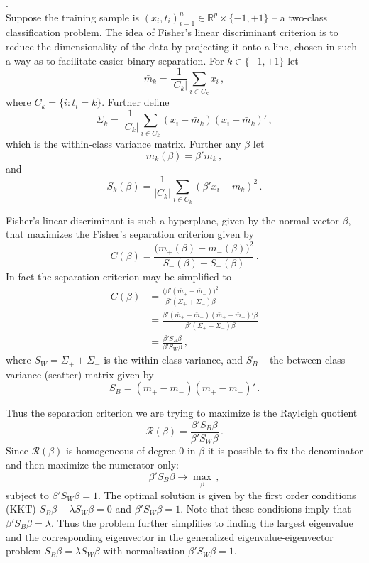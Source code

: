 \documentclass[a4paper]{article}
\newcommand{\Real}{\mathbb{R}}
\begin{document}
 .\hfill\\
Suppose the training sample is $(x_i, t_i)_{i=1}^n \in \Real^p \times\{-1,+1\}$ --
a two-class classification problem. The idea of Fisher's linear discriminant
criterion is to reduce the dimensionality of the data by projecting it onto a line,
chosen in such a way as to facilitate easier binary separation. For $k\in\{-1,+1\}$
let
\[ \bar{m}_k = \frac{1}{|C_k|} \sum_{i\in C_k} x_i \,, \]
where $C_k = \{ i : t_i = k \}$. Further define
\[
\Sigma_k = \frac{1}{|C_k|} \sum_{i\in C_k} ( x_i - \bar{m}_k )( x_i - \bar{m}_k )'\,,
\]
which is the within-class variance matrix. Further any $\beta$ let
\[ m_k(\beta) = \beta'\bar{m}_k\,, \] 
and
\[ S_k(\beta) = \frac{1}{|C_k|} \sum_{i\in C_k} ( \beta'x_i - m_k )^2 \,. \]

Fisher's linear discriminant is such a hyperplane, given by the normal vector $\beta$,
that maximizes the Fisher's separation criterion given by
\[ C(\beta) = \frac{\bigl(m_+(\beta)-m_-(\beta)\bigr)^2}{ S_-(\beta) + S_+(\beta) }\,. \]
In fact the separation criterion may be simplified to
\begin{align*}
	C(\beta)
	&= \frac{\bigl(\beta'(\bar{m}_+ - \bar{m}_-)\bigr)^2}{ \beta'( \Sigma_+ + \Sigma_- )\beta }\\
	&= \frac{\beta'(\bar{m}_+ - \bar{m}_-)(\bar{m}_+ - \bar{m}_-)'\beta}{ \beta'( \Sigma_+ + \Sigma_- )\beta }\\
	&= \frac{\beta'S_B\beta}{ \beta'S_W\beta }\,,
\end{align*}
where $S_W = \Sigma_+ + \Sigma_-$ is the within-class variance, and $S_B$ --
the between class variance (scatter) matrix given by
\[ S_B = (\bar{m}_+ - \bar{m}_-)(\bar{m}_+ - \bar{m}_-)'\,. \]

Thus the separation criterion we are trying to maximize is the Rayleigh quotient
\[ \mathcal{R}(\beta) = \frac{\beta'S_B\beta}{\beta'S_W\beta}\,. \]
Since $\mathcal{R}(\beta)$ is homogeneous of degree $0$ in $\beta$ it is possible
to fix the denominator and then maximize the numerator only:
\[ \beta'S_B\beta \to \max_\beta \,,\]
subject to $\beta'S_W\beta = 1$. The optimal solution is given by the first order
conditions (KKT) $S_B\beta - \lambda S_W \beta = 0$ and $\beta'S_W\beta = 1$.
Note that these conditions imply that $\beta'S_B\beta = \lambda$. Thus the problem
further simplifies to finding the largest eigenvalue and the corresponding eigenvector
in the generalized eigenvalue-eigenvector problem $S_B\beta = \lambda S_W\beta$ with
normalisation $\beta'S_W\beta = 1$.
\end{document}
